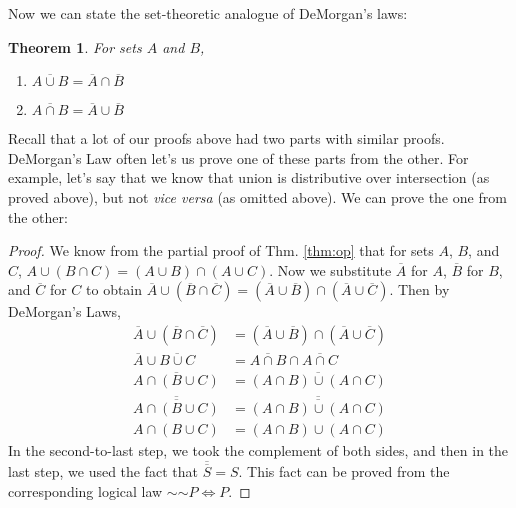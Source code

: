 \documentclass[12pt]{article}
\newcommand*{\oldneg}{\mathord{\sim}}
\newcounter{thmc}
\newtheorem{thm}[thmc]{Theorem}
\begin{document}
Now we can state the set-theoretic analogue of DeMorgan's laws:

\begin{thm}
  For sets $A$ and $B$,
  \begin{enumerate}[label=\alph*)]
  \item $\overline{A\cup B}=\overline{A}\cap\overline{B}$
  \item $\overline{A\cap B}=\overline{A}\cup\overline{B}$
  \end{enumerate}
\end{thm}

Recall that a lot of our proofs above had two parts with similar
proofs.  DeMorgan's Law often let's us prove one of these parts from
the other.  For example, let's say that we know that union is
distributive over intersection (as proved above), but not \textit{vice
  versa} (as omitted above).  We can prove the one from the other:

\begin{proof}
  We know from the partial proof of Thm. \ref{thm:op} that for sets
  $A$, $B$, and $C$, $A\cup(B\cap C)=(A\cup B)\cap(A\cup C)$.  Now we
  substitute $\overline{A}$ for $A$, $\overline{B}$ for $B$, and
  $\overline{C}$ for $C$ to obtain $\overline{A}\cup(\overline{B}\cap
  \overline{C})=(\overline{A}\cup \overline{B})\cap(\overline{A}\cup
  \overline{C})$.  Then by DeMorgan's Laws,
  \begin{align*}
    \overline{A}\cup(\overline{B}\cap \overline{C}) &=
    (\overline{A}\cup\overline{B})\cap(\overline{A}\cup\overline{C})
    \\
    \overline{A}\cup\overline{B\cup C}&=\overline{A\cap
      B}\cap\overline{A\cap C} \\
    \overline{A\cap(B\cup C)}&=\overline{(A\cap B)\cup(A\cap C)}\\
    \overline{\overline{A\cap(B\cup C)}}&=\overline{\overline{(A\cap B)\cup(A\cap C)}}\\
    A\cap(B\cup C)&=(A\cap B)\cup(A\cap C)
  \end{align*}
  In the second-to-last step, we took the complement of both sides,
  and then in the last step, we used the fact that
  $\overline{\overline{S}}=S$.  This fact can be proved from the
  corresponding logical law $\oldneg\oldneg P \Leftrightarrow P$.
\end{proof}
\end{document}
